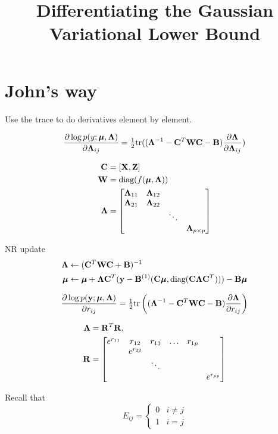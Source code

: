 \documentclass{article}[12pt]
\title{Differentiating the Gaussian Variational Lower Bound}
\begin{document}
\section{John's way}

Use the trace to do derivatives element by element.

\begin{equation*}
	\frac{\partial \log p(y;{\boldsymbol \mu}, {\boldsymbol \Lambda})}{\partial {\boldsymbol\Lambda}_{ij}} = \tfrac{1}{2} \text{tr} (({\boldsymbol \Lambda}^{-1} - {\bf C}^T {\bf W} {\bf C} - {\bf B})\frac{\partial {\boldsymbol\Lambda}}{\partial {\boldsymbol\Lambda}_{ij}})
\end{equation*}

\begin{align*}
	{\bf C} &= [{\bf X}, {\bf Z}] \\
	{\bf W} &= \text{diag}(f({\boldsymbol \mu}, {\boldsymbol \Lambda})) \\
	{\boldsymbol \Lambda} &= \begin{bmatrix}
		{\boldsymbol\Lambda}_{11} & {\boldsymbol \Lambda}_{12} &  &\\
		{\boldsymbol \Lambda}_{21} & {\boldsymbol \Lambda}_{22} &  &\\
		& & \ddots & \\
		& & & {\boldsymbol \Lambda}_{p \times p}
	\end{bmatrix}
\end{align*}

\noindent NR update
\begin{align*}
	{\boldsymbol\Lambda} &\leftarrow ({\bf C}^T {\bf W} {\bf C} + {\bf B})^{-1} \\
	{\boldsymbol \mu} &\leftarrow {\boldsymbol\mu} + {\boldsymbol \Lambda} {\bf C}^T ({\bf y} - {\bf B}^{(1)}({\bf C}{\boldsymbol \mu}, \text{diag} ({\bf C} {\boldsymbol \Lambda} {\bf C}^T))) - {\bf B} {\boldsymbol \mu}
\end{align*}

$$
\frac{\partial \log p ({\bf y};{\boldsymbol \mu}, {\boldsymbol \Lambda})}{\partial r_{ij}} = \tfrac{1}{2} \text{tr} \left (({\boldsymbol \Lambda}^{-1} - {\bf C}^T {\bf W} {\bf C} - {\bf B}) \frac{\partial {\boldsymbol\Lambda}}{\partial r_{ij}} \right )
$$

\begin{align*}
	{\boldsymbol\Lambda} &= {\bf R}^T {\bf R}, \\
	{\bf R} &= \begin{bmatrix}
		e^{r_{11}} & r_{12} & r_{13} & \dots & r_{1p} \\
		& e^{r_{22}} & & & & \\
		&  & \ddots & & & \\
		&  & & & & e^{r_{pp}}\\
	\end{bmatrix}
\end{align*}

\noindent Recall that
$$
	E_{ij} =
	\begin{cases}
		0 & i \ne j \\
		1 & i = j
	\end{cases}
$$
\end{document}

